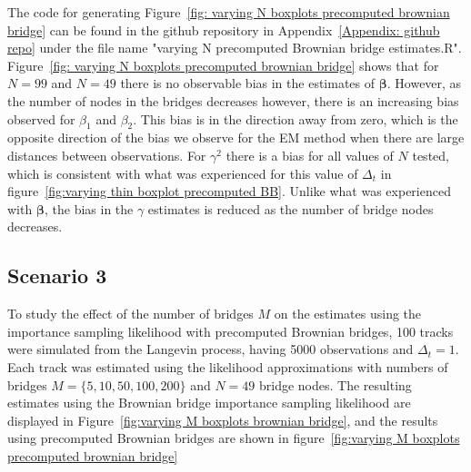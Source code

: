 The code for generating Figure~\ref{fig: varying N boxplots precomputed brownian bridge} can be found in the github repository in Appendix~\ref{Appendix: github repo} under the file name "varying N precomputed Brownian bridge estimates.R". Figure~\ref{fig: varying N boxplots precomputed brownian bridge} shows that for $N=99$ and $N=49$ there is no observable bias in the estimates of $\bm \beta$. However, as the number of nodes in the bridges decreases however, there is an increasing bias observed for $\beta_1$ and $\beta_2$. This bias is in the direction away from zero, which is the opposite direction of the bias we observe for the EM method when there are large distances between observations. For $\gamma^2$ there is a bias for all values of $N$ tested, which is consistent with what was experienced for this value of $\Delta_t$ in figure~\ref{fig:varying thin boxplot precomputed BB}. Unlike what was experienced with $\bm \beta$, the bias in the $\gamma$ estimates is reduced as the number of bridge nodes decreases.

\subsection{Scenario 3}
To study the effect of the number of bridges $M$ on the estimates using the importance sampling likelihood with precomputed Brownian bridges, 100 tracks were simulated from the Langevin process, having 5000 observations and $\Delta_t = 1$. Each track was estimated using the likelihood approximations with numbers of bridges $M=\{5,10,50,100,200\}$ and $N=49$ bridge nodes. The resulting estimates using the Brownian bridge importance sampling likelihood are displayed in Figure~\ref{fig:varying M boxplots brownian bridge}, and the results using precomputed Brownian bridges are shown in figure~\ref{fig:varying M boxplots precomputed brownian bridge}


